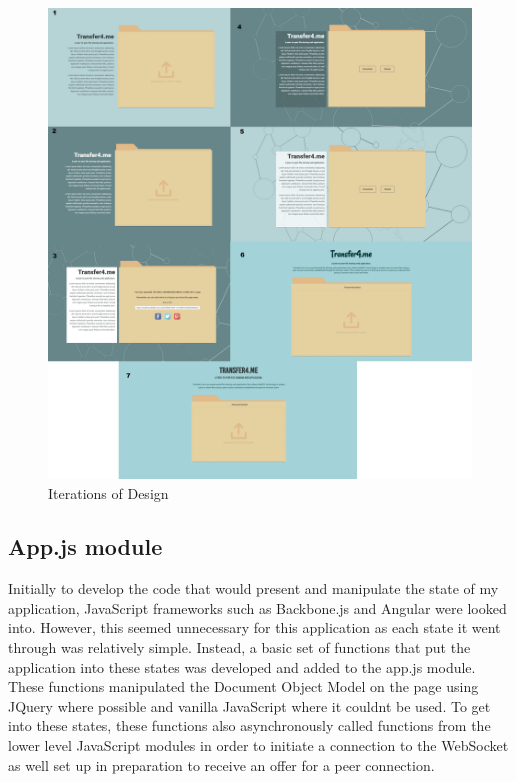 \documentclass[]{report}
\begin{document}
				\begin{figure}[H]
					\caption{Iterations of Design}
					\centering
					\includegraphics[scale=0.15]{design.png}
				\end{figure}
				
			\subsection{App.js module}
			Initially to develop the code that would present and manipulate the state of my application, JavaScript frameworks such as Backbone.js and Angular were looked into. However, this seemed unnecessary for this application as each state it went through was relatively simple. Instead, a basic set of functions that put the application into these states was developed and added to the app.js module. These functions manipulated the Document Object Model on the page using JQuery where possible and vanilla JavaScript where it couldnt be used. To get into these states, these functions also asynchronously called functions from the lower level JavaScript modules in order to initiate a connection to the WebSocket as well set up in preparation to receive an offer for a peer connection.
\end{document}
